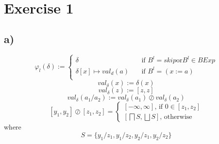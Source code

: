 \documentclass[fleqn,12pt]{article}
\begin{document}
\section*{Exercise 1}
\subsection*{a)}
\[ \varphi_l(\delta) :=
  \begin{cases}
    \delta       & \quad \text{if } B^l = skip \text{or} B^l \in BExp\\
    \delta [x] \mapsto val_d(a) & \quad \text{if } B^l=(x:=a)\\
  \end{cases}
\]
$$val_{\delta}(x):=\delta (x)$$
$$val_{\delta}(z):=[z,z]$$
$$val_{\delta}(a_1/a_2):=val_{\delta}(a_1) \oslash val_{\delta}(a_2)$$
$$[y_1,y_2] \oslash [z_1,z_2]=
	\begin{cases}
		[-\infty,\infty]\text{, if } 0 \in [z_1,z_2]\\
		[\bigsqcap S,\bigsqcup S] \text{, otherwise}
	\end{cases}$$
where $$S=\{y_1/z_1,y_1/z_2,y_2/z_1,y_2/z_2\}$$
\end{document}
